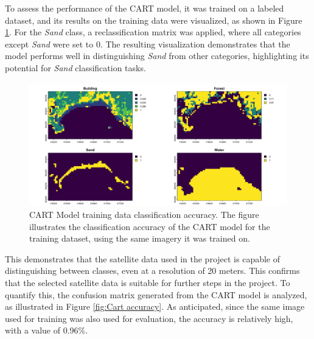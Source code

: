\documentclass[a4paper,12pt]{article}
\begin{document}
To assess the performance of the CART model, it was trained on a labeled dataset, and its results on the training data were visualized, as shown in Figure \ref{fig:CArt_train}. For the \textit{Sand} class, a reclassification matrix was applied, where all categories except \textit{Sand} were set to 0. The resulting visualization demonstrates that the model performs well in distinguishing \textit{Sand} from other categories, highlighting its potential for \textit{Sand} classification tasks.

\begin{figure} [H]
    \centering
    \includegraphics[width=0.8\linewidth]{CART_Model/Trainingdata_CART_Results.png}
    \caption[CART Model training data classification accuracy]{CART Model training data classification accuracy. The figure illustrates the classification accuracy of the CART model for the training dataset, using the same imagery it was trained on.}
    \label{fig:CArt_train}
\end{figure}
This demonstrates that the satellite data used in the project is capable of distinguishing between classes, even at a resolution of 20 meters. This confirms that the selected satellite data is suitable for further steps in the project. To quantify this, the confusion matrix generated from the CART model is analyzed, as illustrated in Figure \ref{fig:Cart accuracy}. As anticipated, since the same image used for training was also used for evaluation, the accuracy is relatively high, with a value of 0.96\%.
\end{document}
